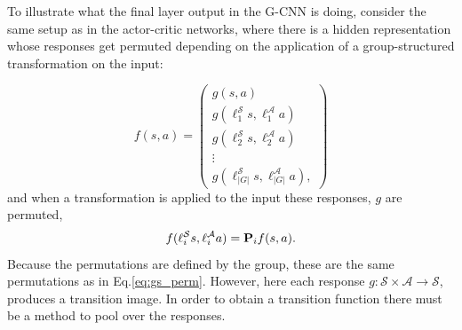 To illustrate what the final layer output in the G-CNN is doing, consider the same setup as in the actor-critic networks, where there is a hidden representation whose responses get permuted depending on the application of a group-structured transformation on the input:

\begin{equation}
	f(s , a) = \begin{pmatrix}
		g(s, a)                                     \\
		g(\ell_1^\mathcal{S}s,\ell^\mathcal{A}_1a)  \\
		g(\ell^\mathcal{S}_2s, \ell^\mathcal{A}_2a) \\
		\vdots                                      \\
		g(\ell_{|G|}^\mathcal{S}s, \ell^\mathcal{A}_{|G|}a),
	\end{pmatrix}
\end{equation}
and when a transformation is applied to the input these responses, $g$ are permuted,
\begin{equation}\label{eq:tm_gcnn}
	f(\ell_i^\mathcal{S}s, \ell_i^\mathcal{A}a) = \mathbf{P}_i f(s, a).
\end{equation}
Because the permutations are defined by the group, these are the same permutations as in Eq.\ref{eq:gs_perm}. However, here each response $g: \mathcal{S} \times \mathcal{A} \rightarrow \mathcal{S}$, produces a transition image. In order to obtain a transition function there must be a method to pool over the responses.

